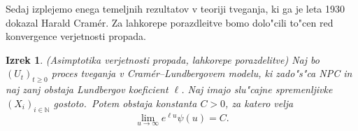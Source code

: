 \documentclass[12pt, a4paper, reqno]{amsart}
\theoremstyle{definition}
\theoremstyle{plain}
\newtheorem{izrek}[definicija]{Izrek}
\newcommand{\N}{\mathbb{N}}
\newcommand{\1}{\mathds{1}}
\begin{document}
            Sedaj izplejemo enega temeljnih rezultatov v teoriji tveganja, ki ga je leta 1930 dokazal Harald 
            Cramér. Za lahkorepe porazdleitve bomo dolo"cili to"cen red konvergence verjetnosti propada.

            \begin{izrek}(Asimptotika verjetnosti propada, lahkorepe porazdelitve)
                Naj bo $(U_t)_{t\geq0}$ proces tveganja v Cramér--Lundbergovem modelu, ki zado"s"ca NPC in 
                naj zanj obstaja Lundbergov koeficient $\ell$. Naj imajo slu"cajne spremenljivke 
                $(X_i)_{i\in\N}$ gostoto.\ Potem obstaja konstanta $C>0$, za katero velja 
                \begin{equation*}
                    \lim_{u\to\infty}e^{\ell u}\psi(u) = C.
                \end{equation*}
                \label{izr:CramerjevaMeja}
            \end{izrek}
\end{document}
